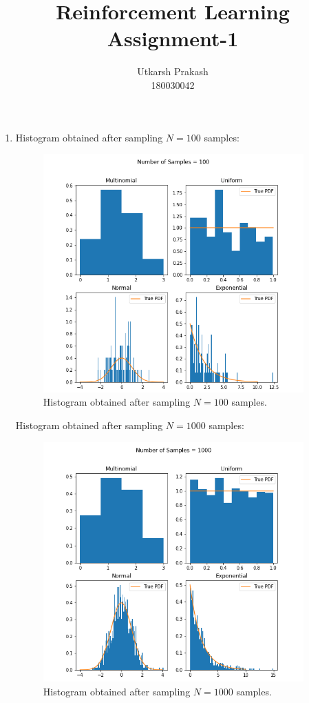 \documentclass{article}
\title{Reinforcement Learning Assignment-1}
\begin{document}
\author{Utkarsh Prakash \\ \normalsize 180030042}
\maketitle
\begin{enumerate}
    \item Histogram obtained after sampling $N=100$ samples:
        \begin{figure}[H]
            \begin{center}
            \includegraphics[width=10cm]{Q1_100.png}
            \end{center}
            \caption{Histogram obtained after sampling $N=100$ samples.}
        \end{figure}

        Histogram obtained after sampling $N=1000$ samples:
        \begin{figure}[H]
            \begin{center}
            \includegraphics[width=10cm]{Q1_1000.png}
            \end{center}
            \caption{Histogram obtained after sampling $N=1000$ samples.}
        \end{figure}


\end{enumerate}
\end{document}
